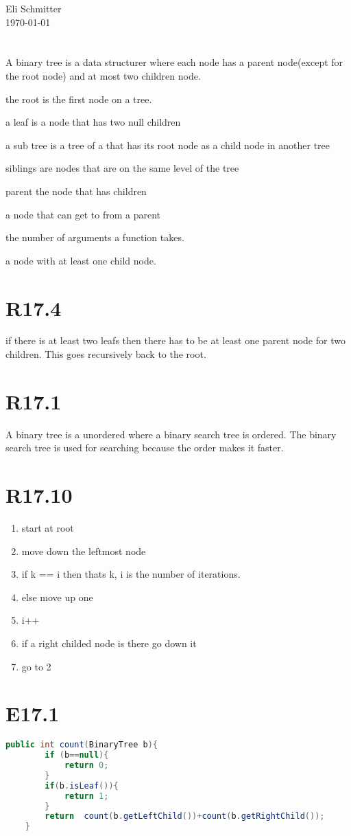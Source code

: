 \documentclass{article}
\begin{document}
\begin{flushleft}
  Eli Schmitter\\
  \today
\end{flushleft}
\section{}
\begin{alphalist}
  \item A binary tree is a data structurer where each node has a parent node(except for the root node) and at most two children node.
  \item the root is the first node on a tree.
  \item a leaf is a node that has two null children
  \item a sub tree is a tree of a that has its root node as a child node in another tree
  \item siblings are nodes that are on the same level of the tree
  \item parent the node that has children
  \item a node that can get to from a parent
  \item the number of arguments a function takes.
  \item a node with at least one child node.
\end{alphalist}
\section{}

\section{R17.4}
if there is at least two leafs then there has to be at least one parent node for two children. This goes recursively back to the root. 
\section{R17.1}
A binary tree is a unordered where a binary search tree is ordered. The binary search tree is used for searching because the order makes it faster.

\section{R17.10}
\begin{enumerate}
\item start at root
\item move down the leftmost node
\item if  k == i then thats k, i is the number of iterations.
\item else move up one
\item i++
\item if a right childed node is there go down it
\item go to 2
\end{enumerate}
\section{E17.1}
\begin{lstlisting}[language=java]
    public int count(BinaryTree b){
        if (b==null){
            return 0;
        }
        if(b.isLeaf()){
            return 1;
        }
        return  count(b.getLeftChild())+count(b.getRightChild());
    }
\end{lstlisting}
\end{document}
